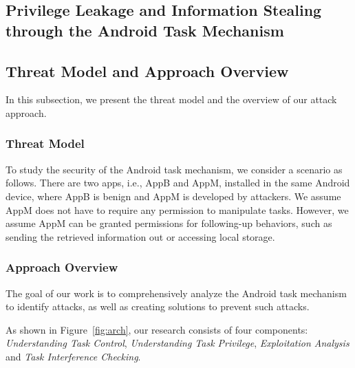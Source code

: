 \documentclass[letterpaper,12pt]{article}
\begin{document}
   \newpage
   \begin{singlespace}
   \section{Privilege Leakage and Information Stealing through the Android Task Mechanism}
   \end{singlespace}
    \label{sec:atmtitle}




\subsection{Threat Model and Approach Overview} \label{sec:threatandapproach}

In this subsection, we present the threat model and the overview of our attack approach.

\subsubsection{Threat Model} \label{subsec:threat}

To study the security of the Android task mechanism, we consider a
scenario as follows. There are two apps, i.e., AppB and AppM,
installed in the same Android device, where AppB is benign and AppM is
developed by attackers.  We assume AppM does not have to require any
permission to manipulate tasks. However, we assume AppM can be granted
permissions for following-up behaviors, such as sending the retrieved
information out or accessing local storage.

\subsubsection{Approach Overview} \label{sec:approachoverview}

The goal of our work is to comprehensively analyze the Android task
mechanism to identify attacks, as well as creating solutions to
prevent such attacks.

As shown in Figure~\ref{fig:arch}, our research consists of four
components: \textsl{Understanding Task Control}, \textsl{Understanding
  Task Privilege}, \textsl{Exploitation Analysis} and \textsl{Task
  Interference Checking}.
\end{document}
